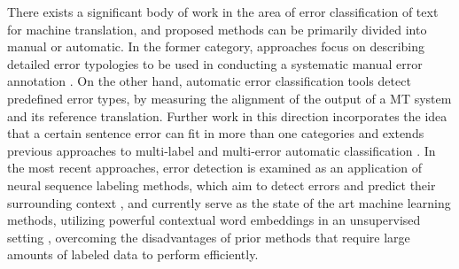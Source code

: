 
There exists a significant body of work in the area of error classification of text for machine translation, and proposed methods can be primarily divided into manual or automatic. In the former category, approaches focus on describing detailed error typologies to be used in conducting a systematic manual error annotation \cite{fishel2011automatic,vilar2006error, lommel2014multidimensional, farrus2010linguistic, costa2015linguistically}. On the other hand,  automatic error classification tools \cite{zeman2011addicter, popovic2011hjerson,popovic2015poor} detect predefined error types, by measuring the alignment of the output of a MT system and its reference translation. Further work in this direction incorporates the idea that a certain sentence error can fit in more than one categories \cite{klubivcka2018quantitative, lommel2014assessing} and extends previous approaches to multi-label and multi-error automatic classification \citet{popovic2019automatic}. In the most recent approaches, error detection is examined as an application of neural sequence labeling methods, which aim to detect errors and predict their surrounding context \cite{rei2017semi}, and currently serve as the state of the art machine learning methods, utilizing powerful contextual word embeddings in an unsupervised setting \cite{bell2019context}, overcoming the disadvantages of prior methods that require large amounts of labeled data to perform efficiently.